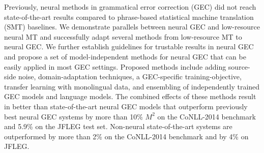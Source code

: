 Previously, neural methods in grammatical error correction (GEC) did not reach state-of-the-art results compared to phrase-based statistical machine translation (SMT) baselines. We demonstrate parallels between neural GEC and low-resource neural MT and successfully adapt several methods from low-resource MT to neural GEC. We further establish guidelines for trustable results in neural GEC and propose a set of model-independent methods for neural GEC that can be easily applied in most GEC settings. Proposed methods include adding source-side noise, domain-adaptation techniques, a GEC-specific training-objective, transfer learning with monolingual data, and ensembling of independently trained GEC models and language models. The combined effects of these methods result in better than state-of-the-art neural GEC models that outperform previously best neural GEC systems by more than 10\% $M^2$ on the CoNLL-2014 benchmark and 5.9\% on the JFLEG test set. Non-neural state-of-the-art systems are outperformed by more than 2\% on the CoNLL-2014 benchmark and by 4\% on JFLEG.
